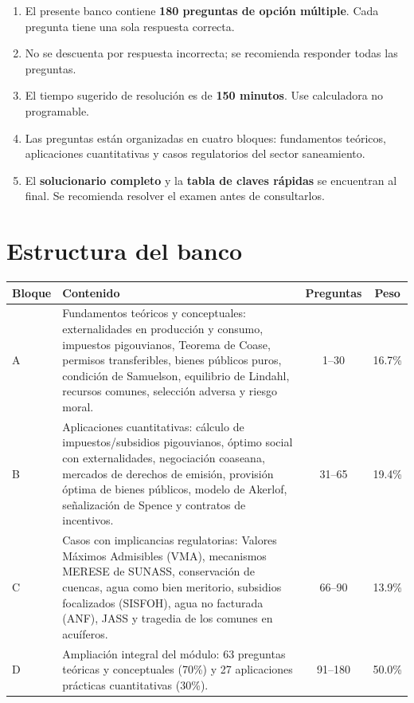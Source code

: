 \documentclass[11pt,a4paper]{article}
\begin{document}
\begin{enumerate}[label=\arabic*.,leftmargin=1.6em,itemsep=3pt]
  \item El presente banco contiene \textbf{180 preguntas de opción múltiple}. Cada pregunta tiene una sola respuesta correcta.
  \item No se descuenta por respuesta incorrecta; se recomienda responder todas las preguntas.
  \item El tiempo sugerido de resolución es de \textbf{150 minutos}. Use calculadora no programable.
  \item Las preguntas están organizadas en cuatro bloques: fundamentos teóricos, aplicaciones cuantitativas y casos regulatorios del sector saneamiento.
  \item El \textbf{solucionario completo} y la \textbf{tabla de claves rápidas} se encuentran al final. Se recomienda resolver el examen antes de consultarlos.
\end{enumerate}

\section*{Estructura del banco}

\begin{center}
\renewcommand{\arraystretch}{1.25}
\begin{tabular}{@{}p{1.4cm}>{\raggedright\arraybackslash}p{7.6cm}cc@{}}
\toprule
\textbf{Bloque} & \textbf{Contenido} & \textbf{Preguntas} & \textbf{Peso} \\
\midrule
A & Fundamentos teóricos y conceptuales: externalidades en producción y consumo, impuestos pigouvianos, Teorema de Coase, permisos transferibles, bienes públicos puros, condición de Samuelson, equilibrio de Lindahl, recursos comunes, selección adversa y riesgo moral. & 1--30 & 16.7\% \\
B & Aplicaciones cuantitativas: cálculo de impuestos/subsidios pigouvianos, óptimo social con externalidades, negociación coaseana, mercados de derechos de emisión, provisión óptima de bienes públicos, modelo de Akerlof, señalización de Spence y contratos de incentivos. & 31--65 & 19.4\% \\
C & Casos con implicancias regulatorias: Valores Máximos Admisibles (VMA), mecanismos MERESE de SUNASS, conservación de cuencas, agua como bien meritorio, subsidios focalizados (SISFOH), agua no facturada (ANF), JASS y tragedia de los comunes en acuíferos. & 66--90 & 13.9\% \\
D & Ampliación integral del módulo: 63 preguntas teóricas y conceptuales (70\%) y 27 aplicaciones prácticas cuantitativas (30\%). & 91--180 & 50.0\% \\
\bottomrule
\end{tabular}
\end{center}
\end{document}
